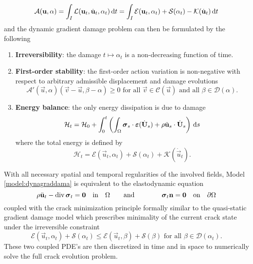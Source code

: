 \begin{equation} \label{eq:action}
\mathcal{A}(\vec{u},\alpha)=\int_I\mathcal{L}(\vec{u}_t,\dot{\vec{u}}_t,\alpha_t)\,\mathrm{d}t=\int_I\mathcal{E}(\vec{u}_t,\alpha_t)+\mathcal{S}(\alpha_t)-\mathcal{K}(\dot{\vec{u}}_t)\D{t}
\end{equation}
and the dynamic gradient damage problem can then be formulated by the following
\begin{model} \label{model:dynagraddama}
\begin{enumerate}
\item \textbf{Irreversibility}: the damage $t\mapsto\alpha_t$ is a non-decreasing function of time.
\item \textbf{First-order stability}: the first-order action variation is non-negative with respect to arbitrary admissible displacement and damage evolutions
\begin{equation} \label{eq:vi}
\mathcal{A}'(\vec{u},\alpha)(\vec{v}-\vec{u},\beta-\alpha)\geq 0\text{ for all $\vec{v}\in\mathcal{C}(\vec{u})$ and all $\beta\in\mathcal{D}(\alpha)$}.
\end{equation}
\item \textbf{Energy balance}: the only energy dissipation is due to damage
\begin{equation} \label{eq:dyngdeb}
\mathcal{H}_t=\mathcal{H}_0+\int_0^t\left(\int_\Omega\sig_s\cdot\eps(\dot{\vec{U}}_s)+\rho\ddot{\vec{u}}_s\cdot\dot{\vec{U}}_s\right)\D{s}
\end{equation}
where the total energy is defined by
\begin{equation}
\mathcal{H}_t=\mathcal{E}(\vec{u}_t,\alpha_t)+\mathcal{S}(\alpha_t)+\mathcal{K}(\dot{\vec{u}}_t).
\end{equation}
\end{enumerate}
\end{model}

With all necessary spatial and temporal regularities of the involved fields, Model \ref{model:dynagraddama} is equivalent to the elastodynamic equation
\begin{equation} \label{eq:waveeq}
\rho\ddot{\vec{u}}_t-\div\sig_t=\vec{0}\quad\text{in}\quad\Omega\qquad\text{and}\qquad\qquad\sig_t\vec{n}=\vec{0}\quad\text{on}\quad\partial\Omega
\end{equation}
coupled with the crack minimization principle formally similar to the quasi-static gradient damage model \cite{PhamMarigo:2010-1} which prescribes minimality of the current crack state under the irreversible constraint
\begin{equation} \label{eq:crackmin}
\mathcal{E}(\vec{u}_t,\alpha_t)+\mathcal{S}(\alpha_t)\leq \mathcal{E}(\vec{u}_t,\beta)+\mathcal{S}(\beta)\text{ for all $\beta\in\mathcal{D}(\alpha_t)$}.
\end{equation}
These two coupled PDE's are then discretized in time and in space to numerically solve the full crack evolution problem.

